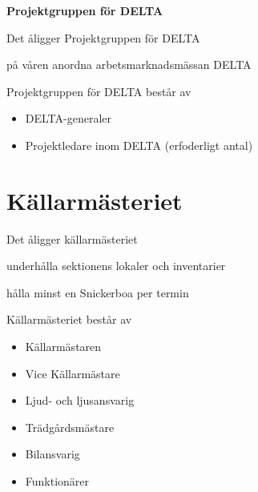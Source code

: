 \documentclass[pdfbookmarks,a4paper,11pt]{article}
\newlength{\itemcollength}
\newenvironment{reglemlista}{%
  \begin{list}{}{%
      \setlength{\labelwidth}{\itemcollength}%
      \setlength{\leftmargin}{\labelwidth + \labelsep}%
      \renewcommand{\makelabel}[1]{%
        \raisebox{0pt}[1ex][0pt]{%
          \makebox[\labelwidth][l]{%
            \parbox[t]{\itemcollength}{%
              \raggedright\hspace{0pt}##1}}}\hfill}%
      }}{%
  \end{list}}
\begin{document}
\textbf{Projektgruppen för DELTA}
\begin{reglemlista}
	\item[Åligganden]
	Det åligger Projektgruppen för DELTA

	\begin{attlista}
		\item på våren anordna arbetsmarknadsmässan DELTA
	\end{attlista}

	\item[Sammansättning]
	Projektgruppen för DELTA består av
	\begin{itemize}
		\item DELTA-generaler
		\item Projektledare inom DELTA (erfoderligt antal)
	\end{itemize}

\end{reglemlista}


\section{Källarmästeriet}

\begin{reglemlista}

	\item[Åligganden]
	Det åligger källarmästeriet
	\begin{attlista}
		\item underhålla sektionens lokaler och inventarier
		\item hålla minst en Snickerboa per termin
	\end{attlista}


	\item[Sammansättning]
	Källarmästeriet består av
	\begin{itemize}
		\item Källarmästaren
		\item Vice Källarmästare
		\item Ljud- och ljusansvarig
		\item Trädgårdsmästare
        \item Bilansvarig
		\item Funktionärer
	\end{itemize}

\end{reglemlista}
\end{document}
